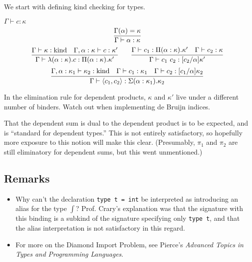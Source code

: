We start with defining kind checking for types.
\begin{judgment}
  $\Gamma \vdash c : \kappa$
  \[
    \infer{\Gamma \vdash \alpha : \kappa}{\Gamma(\alpha) = \kappa}
  \]
  \[
    \infer{\Gamma \vdash \lambda(\alpha : \kappa).c : \Pi(\alpha : \kappa).\kappa'}
      {\Gamma \vdash \kappa : \kind
      &\Gamma, \alpha : \kappa \vdash c : \kappa'
      }
    \qquad
    \infer{\Gamma \vdash c_1~c_2 : [c_2 / \alpha]\kappa'}
      {\Gamma \vdash c_1 : \Pi(\alpha:\kappa).\kappa'
      &\Gamma \vdash c_2 : \kappa
      }
  \]
  \[
    \infer{\Gamma \vdash \langle c_1, c_2 \rangle : \Sigma(\alpha : \kappa_1).\kappa_2}
      {\Gamma, \alpha : \kappa_1 \vdash \kappa_2 : \kind
      &\Gamma \vdash c_1 : \kappa_1
      &\Gamma \vdash c_2 : [c_1/\alpha]\kappa_2
      }
  \]
\end{judgment}
In the elimination rule for dependent products, $\kappa$ and $\kappa'$ live under a different
number of binders. Watch out when implementing de Bruijn indices.

That the dependent sum is dual to the dependent product is to be expected, and is
``standard for dependent types.'' This is not entirely satisfactory, so hopefully more
exposure to this notion will make this clear. (Presumably, $\pi_1$ and $\pi_2$ are
still eliminatory for dependent sums, but this went unmentioned.)

\subsection{Remarks}
\begin{itemize}
\item Why can't the declaration \texttt{type t = int} be interpreted as introducing an
  alias for the type $\int$? Prof\@. Crary's explanation was that the signature with this
  binding is a subkind of the signature specifying only \texttt{type t}, and that the
  alias interpretation is not satisfactory in this regard.
\item For more on the Diamond Import Problem, see Pierce's \emph{Advanced Topics in Types and
  Programming Languages}.
\end{itemize}
